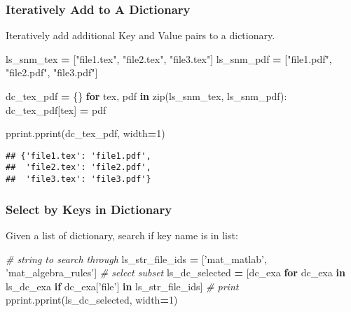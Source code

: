\documentclass[
]{book}
\newenvironment{Shaded}{\begin{snugshade}}{\end{snugshade}}
\newcommand{\BuiltInTok}[1]{#1}
\newcommand{\CommentTok}[1]{\textcolor[rgb]{0.56,0.35,0.01}{\textit{#1}}}
\newcommand{\ControlFlowTok}[1]{\textcolor[rgb]{0.13,0.29,0.53}{\textbf{#1}}}
\newcommand{\DecValTok}[1]{\textcolor[rgb]{0.00,0.00,0.81}{#1}}
\newcommand{\KeywordTok}[1]{\textcolor[rgb]{0.13,0.29,0.53}{\textbf{#1}}}
\newcommand{\NormalTok}[1]{#1}
\newcommand{\OperatorTok}[1]{\textcolor[rgb]{0.81,0.36,0.00}{\textbf{#1}}}
\newcommand{\StringTok}[1]{\textcolor[rgb]{0.31,0.60,0.02}{#1}}
\begin{document}
\hypertarget{iteratively-add-to-a-dictionary}{%
\subsubsection{Iteratively Add to A Dictionary}\label{iteratively-add-to-a-dictionary}}

Iteratively add additional Key and Value pairs to a dictionary.

\begin{Shaded}
\begin{Highlighting}[]

\NormalTok{ls_snm_tex }\OperatorTok{=}\NormalTok{ [}\StringTok{"file1.tex"}\NormalTok{, }\StringTok{"file2.tex"}\NormalTok{, }\StringTok{"file3.tex"}\NormalTok{]}
\NormalTok{ls_snm_pdf }\OperatorTok{=}\NormalTok{ [}\StringTok{"file1.pdf"}\NormalTok{, }\StringTok{"file2.pdf"}\NormalTok{, }\StringTok{"file3.pdf"}\NormalTok{]}

\NormalTok{dc_tex_pdf }\OperatorTok{=}\NormalTok{ \{\}}
\ControlFlowTok{for}\NormalTok{ tex, pdf }\KeywordTok{in} \BuiltInTok{zip}\NormalTok{(ls_snm_tex, ls_snm_pdf):}
\NormalTok{  dc_tex_pdf[tex] }\OperatorTok{=}\NormalTok{ pdf}

\NormalTok{pprint.pprint(dc_tex_pdf, width}\OperatorTok{=}\DecValTok{1}\NormalTok{)}
\end{Highlighting}
\end{Shaded}

\begin{verbatim}
## {'file1.tex': 'file1.pdf',
##  'file2.tex': 'file2.pdf',
##  'file3.tex': 'file3.pdf'}
\end{verbatim}

\hypertarget{select-by-keys-in-dictionary}{%
\subsubsection{Select by Keys in Dictionary}\label{select-by-keys-in-dictionary}}

Given a list of dictionary, search if key name is in list:

\begin{Shaded}
\begin{Highlighting}[]
\CommentTok{# string to search through}
\NormalTok{ls_str_file_ids }\OperatorTok{=}\NormalTok{ [}\StringTok{'mat_matlab'}\NormalTok{, }\StringTok{'mat_algebra_rules'}\NormalTok{]}
\CommentTok{# select subset}
\NormalTok{ls_dc_selected }\OperatorTok{=}\NormalTok{ [dc_exa}
                  \ControlFlowTok{for}\NormalTok{ dc_exa }\KeywordTok{in}\NormalTok{ ls_dc_exa}
                  \ControlFlowTok{if}\NormalTok{ dc_exa[}\StringTok{'file'}\NormalTok{] }\KeywordTok{in}\NormalTok{ ls_str_file_ids]}
\CommentTok{# print}
\NormalTok{pprint.pprint(ls_dc_selected, width}\OperatorTok{=}\DecValTok{1}\NormalTok{)}
\end{Highlighting}
\end{Shaded}
\end{document}
